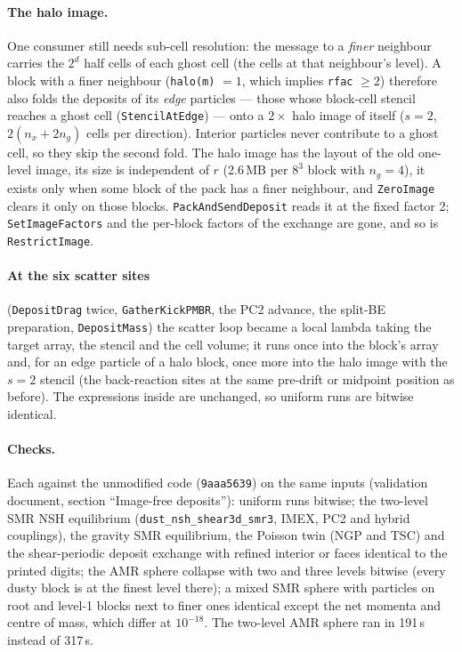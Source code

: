 \documentclass[11pt]{article}
\newcommand{\code}[1]{\texttt{#1}}
\newcommand{\fn}[1]{\texttt{\small #1}}
\begin{document}
\paragraph{The halo image.} One consumer still needs sub-cell resolution: the message to
a \emph{finer} neighbour carries the $2^d$ half cells of each ghost cell (the cells at that
neighbour's level). A block with a finer neighbour (\code{halo(m)} $= 1$, which implies
\code{rfac} $\ge 2$) therefore also folds the deposits of its \emph{edge} particles --- those
whose block-cell stencil reaches a ghost cell (\fn{StencilAtEdge}) --- onto a $2\times$
halo image of itself ($s = 2$, $2(n_x + 2n_g)$ cells per direction). Interior particles
never contribute to a ghost cell, so they skip the second fold. The halo image has the
layout of the old one-level image, its size is independent of $r$ (2.6\,MB per $8^3$ block
with $n_g = 4$), it exists only when some block of the pack has a finer neighbour, and
\fn{ZeroImage} clears it only on those blocks. \fn{PackAndSendDeposit} reads it at the
fixed factor 2; \fn{SetImageFactors} and the per-block factors of the exchange are gone,
and so is \fn{RestrictImage}.

\paragraph{At the six scatter sites} (\fn{DepositDrag} twice, \fn{GatherKickPMBR}, the PC2
advance, the split-BE preparation, \fn{DepositMass}) the scatter loop became a local
lambda taking the target array, the stencil and the cell volume; it runs once into the
block's array and, for an edge particle of a halo block, once more into the halo image
with the $s = 2$ stencil (the back-reaction sites at the same pre-drift or midpoint
position as before). The expressions inside are unchanged, so uniform runs are bitwise
identical.

\paragraph{Checks.} Each against the unmodified code (\code{9aaa5639}) on the same inputs
(validation document, section ``Image-free deposits''): uniform runs bitwise; the
two-level SMR NSH equilibrium (\code{dust\_nsh\_shear3d\_smr3}, IMEX, PC2 and hybrid
couplings), the gravity SMR equilibrium, the Poisson twin (NGP and TSC) and the
shear-periodic deposit exchange with refined interior or faces identical to the printed
digits; the AMR sphere collapse with two and three levels bitwise (every dusty block is at
the finest level there); a mixed SMR sphere with particles on root and level-1 blocks next
to finer ones identical except the net momenta and centre of mass, which differ at
$10^{-18}$. The two-level AMR sphere ran in 191\,s instead of 317\,s.
\end{document}
